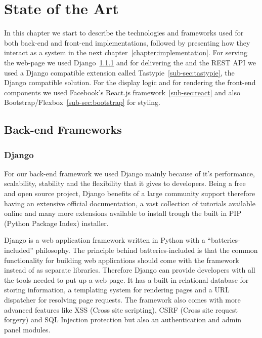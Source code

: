 \chapter{State of the Art}
\label{chapter:state}

In this chapter we start to describe the technologies and frameworks used for both back-end and front-end implementations, followed by presenting how they interact as a system in the next chapter~\ref{chapter:implementation}. For serving the web-page we used Django~\ref{sub-sec:django} and for delivering the and the REST API we used a Django compatible extension called Tastypie~\ref{sub-sec:tastypie}, the Django compatible solution. For the display logic and for rendering the front-end components we used Facebook's React.js framework~\ref{sub-sec:react} and also Bootstrap/Flexbox~\ref{sub-sec:bootstrap} for styling.

\section{Back-end Frameworks}
\label{sec:backend}

\subsection{Django}
\label{sub-sec:django}

For our back-end framework we used Django mainly because of it's performance, scalability, stability and the flexibility that it gives to developers. Being a free and open source project, Django benefits of a large community support therefore having an extensive official documentation, a vast collection of tutorials available online and many more extensions available to install trough the built in PIP (Python Package Index) installer.

Django is a web application framework written in Python with a ``batteries-included'' philosophy. The principle behind batteries-included is that the common functionality for building web applications should come with the framework instead of as separate libraries. Therefore Django can provide developers with all the tools needed to put up a web page. It has a built in relational database for storing information, a templating system for rendering pages and a URL dispatcher for resolving page requests. The framework also comes with more advanced features like XSS (Cross site scripting), CSRF (Cross site request forgery) and SQL Injection protection but also an authentication and admin panel modules.

